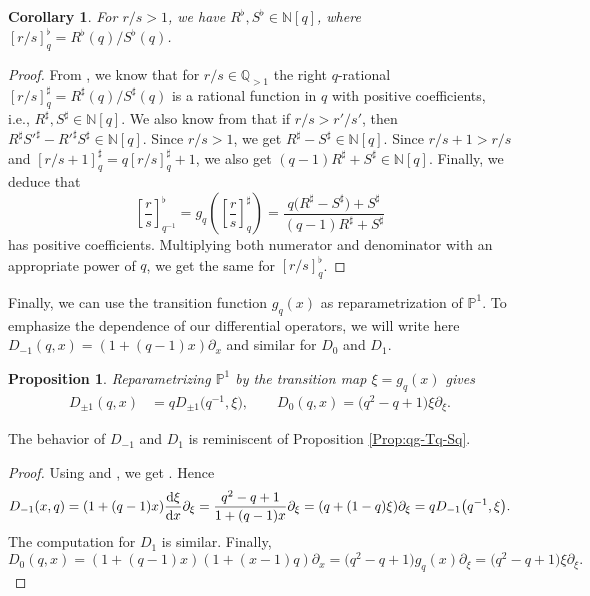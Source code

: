 \documentclass[10pt,a4paper]{amsart}
\numberwithin{equation}{section}
\newtheorem{Corollary}[Theorem]{Corollary}
\newtheorem{Proposition}[Theorem]{Proposition}
 { \theoremstyle{definition}
\newtheorem{Definition}[Theorem]{Definition}
\newtheorem{Note}[Theorem]{Note}
\newtheorem{Example}[Theorem]{Example}
\newtheorem{Remark}[Theorem]{Remark} }
\newcommand*{\Q}{\mathbb{Q}}
\newcommand*{\N}{\mathbb{N}}
\begin{document}
\begin{Corollary}
For $r/s>1$, we have $R^\flat, S^\flat\in\N[q]$, where $[r/s]_q^\flat=R^\flat(q)/S^\flat(q)$.
\end{Corollary}
\begin{proof}
From \cite[Proposition 1.3]{morier2020continued}, we know that for $r/s\in\Q_{>1}$ the right $q$-rational $[r/s]_q^\sharp=R^\sharp(q)/S^\sharp(q)$ is a rational function in $q$ with positive coefficients, i.e., $R^\sharp, S^\sharp\in \mathbb{N}[q]$. We also know from \cite[Theorem 2]{morier2020continued} that if $r/s> r'/s'$, then $R^\sharp S'^\sharp-R'^\sharp S^\sharp \in \N[q]$. Since ${r/s>1}$, we get ${R^\sharp-S^\sharp\in\N[q]}$. Since $r/s+1>r/s$ and $[r/s+1]_q^\sharp=q[r/s]_q^\sharp+1$, we also get ${(q-1)R^\sharp+S^\sharp \in\N[q]}$. Finally, we deduce that
\[
\left[\frac{r}{s}\right]_{q^{-1}}^\flat = g_q\left(\left[\frac{r}{s}\right]_q^\sharp\right)=\frac{q\big(R^\sharp-S^\sharp\big)+S^\sharp}{(q-1)R^\sharp+S^\sharp}
\]
has positive coefficients. Multiplying both numerator and denominator with an appropriate power of $q$, we get the same for $[r/s]^\flat_q$.
\end{proof}


Finally, we can use the transition function $g_q(x)$ as reparametrization of $\mathbb{P}^1$. To emphasize the dependence of our differential operators, we will write here $D_{-1}(q,x)=(1+(q-1)x)\partial_x$ and similar for $D_0$ and $D_{1}$.
\begin{Proposition}
Reparametrizing $\mathbb{P}^1$ by the transition map $\xi=g_q(x)$ gives
\begin{align*}
D_{\pm 1}(q,x) &= q D_{\pm 1}\big(q^{-1},\xi\big), \qquad
D_0(q,x) = \big(q^2-q+1\big)\xi \partial_\xi.
\end{align*}
\end{Proposition}
The behavior of $D_{-1}$ and $D_1$ is reminiscent of Proposition \ref{Prop:qg-Tq-Sq}.
\begin{proof}
Using  and , we get . Hence
\[
D_{-1}(x,q)=(1+(q-1)x)\frac{{\rm d}\xi}{{\rm d}x}\partial_\xi = \frac{q^2-q+1}{1+(q-1)x}\partial_\xi = (q+(1-q)\xi)\partial_\xi = qD_{-1}\big(q^{-1},\xi\big).
\]
The computation for $D_{1}$ is similar. Finally,
\[
D_0(q,x)=(1+(q-1)x)(1+(x-1)q)\partial_x = \big(q^2-q+1\big)g_q(x)\partial_\xi = \big(q^2-q+1\big)\xi\partial_\xi.\tag*{\qed}
\]\renewcommand{\qed}{}
\end{proof}
\end{document}

